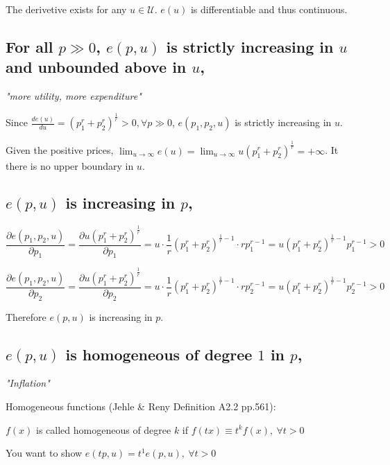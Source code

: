 \documentclass{article}
\begin{document}
The derivetive exists for any $u \in \mathcal{U}$. $e(u)$ is differentiable and thus continuous.


\subsection{For all $p \gg 0$, $e(p, u)$ is strictly increasing in $u$ and unbounded above in $u$,}
\begin{mdframed}[backgroundcolor=blue!20,linecolor=white]
\textit{"more utility, more expenditure"}

\end{mdframed}


Since $\frac{d e(u)}{d u} = (p_1^{r} + p_2^{r})^{\frac{1}{r}} > 0, \forall p \gg 0$,
$e(p_1,p_2,u)$ is strictly increasing in $u$.

Given the positive prices, $\lim_{u\to\infty} e(u) = \lim_{u\to\infty} u(p_1^{r} + p_2^{r})^{\frac{1}{r}}= + \infty$. It there is no upper boundary in $u$.


\subsection{$e(p, u)$ is increasing in $p$,}

$$\frac{\partial e(p_1,p_2, u)}{\partial p_1} = \frac{\partial u(p_1^{r} + p_2^{r})^{\frac{1}{r}} }{\partial p_1} = u \cdot \frac{1}{r}(p_1^{r} + p_2^{r})^{\frac{1}{r} - 1} \cdot r  p_1^{r-1} =
u (p_1^{r} + p_2^{r})^{\frac{1}{r} - 1} p_1^{r-1} > 0$$

$$\frac{\partial e(p_1,p_2, u)}{\partial p_2} = \frac{\partial u(p_1^{r} + p_2^{r})^{\frac{1}{r}} }{\partial p_2} = u \cdot \frac{1}{r}(p_1^{r} + p_2^{r})^{\frac{1}{r} - 1} \cdot r  p_2^{r-1} =
u (p_1^{r} + p_2^{r})^{\frac{1}{r} - 1} p_2^{r-1} > 0$$

Therefore $e(p, u)$ is increasing in $p$.


\subsection{$e(p, u)$ is homogeneous of degree $1$ in $p$,}

\begin{mdframed}[backgroundcolor=blue!20,linecolor=white]

\textit{"Inflation"}

Homogeneous functions (Jehle \& Reny Definition A2.2 pp.561):

$f(x)$ is called homogeneous of degree $k$ if $f(tx) \equiv t^kf(x),\ \forall t > 0$

You want to show $e(tp, u) = t^1e(p, u),\ \forall t > 0$
\end{mdframed}
\end{document}
